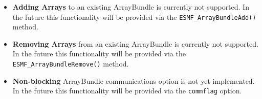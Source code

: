 
\begin{itemize}

\item {\bf Adding Arrays} to an existing ArrayBundle is currently not supported. In the future this functionality will be provided via the
{\tt ESMF\_ArrayBundleAdd()} method.

\item {\bf Removing Arrays} from an existing ArrayBundle is currently not supported. In the future this functionality will be provided via the
{\tt ESMF\_ArrayBundleRemove()} method.

\item {\bf Non-blocking} ArrayBundle communications option is not yet implemented. In the future this functionality will be provided via the
{\tt commflag} option.

\end{itemize}
